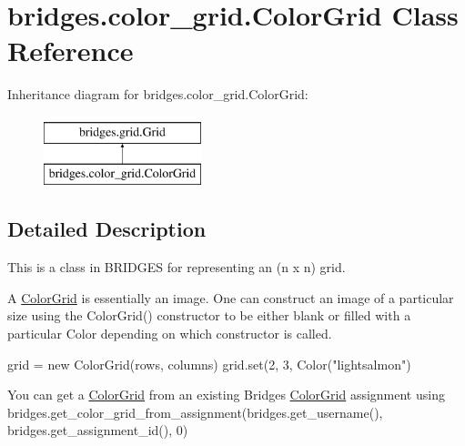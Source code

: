 \hypertarget{classbridges_1_1color__grid_1_1_color_grid}{}\section{bridges.\+color\+\_\+grid.\+Color\+Grid Class Reference}
\label{classbridges_1_1color__grid_1_1_color_grid}
Inheritance diagram for bridges.\+color\+\_\+grid.\+Color\+Grid\+:\begin{figure}[H]
\begin{center}
\leavevmode
\includegraphics[height=2.000000cm]{classbridges_1_1color__grid_1_1_color_grid}
\end{center}
\end{figure}


\subsection{Detailed Description}
This is a class in B\+R\+I\+D\+G\+ES for representing an (n x n) grid. 

A \hyperlink{classbridges_1_1color__grid_1_1_color_grid}{Color\+Grid} is essentially an image. One can construct an image of a particular size using the Color\+Grid() constructor to be either blank or filled with a particular Color depending on which constructor is called.


\begin{DoxyCode}
grid = new ColorGrid(rows, columns)
grid.set(2, 3, Color(\textcolor{stringliteral}{"lightsalmon"})
\end{DoxyCode}


You can get a \hyperlink{classbridges_1_1color__grid_1_1_color_grid}{Color\+Grid} from an existing Bridges \hyperlink{classbridges_1_1color__grid_1_1_color_grid}{Color\+Grid} assignment using bridges.\+get\+\_\+color\+\_\+grid\+\_\+from\+\_\+assignment(bridges.\+get\+\_\+username(), bridges.\+get\+\_\+assignment\+\_\+id(), 0)

